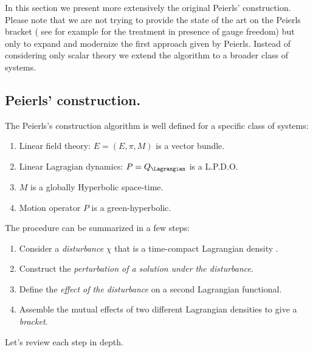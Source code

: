 \documentclass[Main]{subfiles}
\begin{document}
		In this section we present more extensively the original Peierls' construction. 
		Please note that we are not trying to provide the state of the art on the Peierls bracket ( see for example \cite{Khavkine2014} for the treatment in presence of gauge freedom) but only to expand and modernize the first approach given by Peierls.
	Instead of considering only scalar theory we extend the algorithm to a broader class of systems.
	
	\subsection{Peierls' construction.}
	The Peierls's construction algorithm is well defined for a specific class of systems:
		\begin{enumerate}
			\item Linear field theory: $E=(E,\pi,M)$ is a vector bundle.
			\item Linear Lagragian dynamics: $P=Q_\Lagrangian$ is a L.P.D.O.
			\item $M$ is a globally Hyperbolic space-time.
			\item Motion operator $P$ is a green-hyperbolic.
		\end{enumerate}	
	The procedure can be summarized in a few steps:
	\begin{enumerate}
		\item Consider a \emph{disturbance} $\chi$ that is a time-compact Lagrangian density .
		\item Construct the \emph{perturbation of a solution under the disturbance}.
		\item Define the \emph{effect of the disturbance} on a second Lagrangian functional.
		\item Assemble the mutual effects of two different Lagrangian densities to give a \emph{bracket}.
	\end{enumerate}	
	Let's review each step in depth.
	
\end{document}
